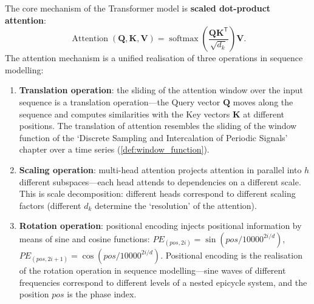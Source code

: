 \begin{definition}\label{def:self_attention_periodic}
The core mechanism of the Transformer model is \textbf{scaled dot-product attention}:
\[
\operatorname{Attention}(\mathbf{Q}, \mathbf{K}, \mathbf{V}) = \operatorname{softmax}\left(\frac{\mathbf{Q}\mathbf{K}^{\mathsf T}}{\sqrt{d_k}}\right) \mathbf{V}.
\]
The attention mechanism is a unified realisation of three operations in sequence modelling:
\begin{enumerate}[label=(\roman*)]
    \item \textbf{Translation operation}: the sliding of the attention window over the input sequence is a translation operation---the Query vector $\mathbf{Q}$ moves along the sequence and computes similarities with the Key vectors $\mathbf{K}$ at different positions. The translation of attention resembles the sliding of the window function of the `Discrete Sampling and Intercalation of Periodic Signals' chapter over a time series (\cref{def:window_function}).
    \item \textbf{Scaling operation}: multi-head attention projects attention in parallel into $h$ different subspaces---each head attends to dependencies on a different scale. This is scale decomposition: different heads correspond to different scaling factors (different $d_k$ determine the `resolution' of the attention).
    \item \textbf{Rotation operation}: positional encoding injects positional information by means of sine and cosine functions: $PE_{(pos, 2i)} = \sin(pos/10000^{2i/d})$, $PE_{(pos, 2i+1)} = \cos(pos/10000^{2i/d})$. Positional encoding is the realisation of the rotation operation in sequence modelling---sine waves of different frequencies correspond to different levels of a nested epicycle system, and the position $pos$ is the phase index.
\end{enumerate}
\end{definition}

